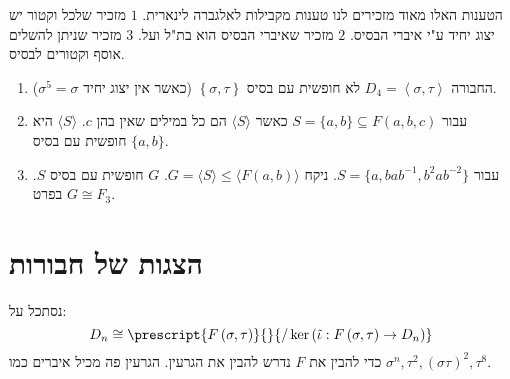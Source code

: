 \documentclass{tstextbook}
\begin{document}
\begin{remark}
הטענות האלו מאוד מזכירים לנו טענות מקבילות לאלגברה לינארית. \(1\) מזכיר שלכל וקטור יש יצוג יחיד ע"י איברי הבסיס. \(2\) מזכיר שאיברי הבסיס הוא בת"ל ועל. \(3\) מזכיר שניתן להשלים אוסף וקטורים לבסיס.

\end{remark}
\begin{example}
  \begin{enumerate}
    \item החבורה \(D_{4}=\left\langle  \sigma,\tau  \right\rangle\) לא חופשית עם בסיס \(\left\{  \sigma,\tau  \right\}\) (כאשר אין יצוג יחיד \(\sigma^5=\sigma\)). 


    \item עבור \(S=\{ a,b \}\subseteq F(a,b,c)\) כאשר \(\langle S\rangle\) הם כל במילים שאין בהן \(c\). \(\langle S\rangle\) היא חופשית עם בסיס \(\{ a,b \}\). 


    \item עבור \(S=\{ a,bab^{-1} ,b^2ab^{-2} \}\). ניקח \(G=\langle S\rangle \leq\langle F(a,b)\rangle\). \(G\) חופשית עם בסיס \(S\). בפרט \(G\cong F_{3}\). 


  \end{enumerate}
\end{example}
\section{הצגות של חבורות}

נסתכל על:
$$D_{n}\cong \prescript{F\left( \sigma,\tau \right)}{}{/\ker\left( \tilde{\iota}:F\left( \sigma,\tau \right)\to D_{n} \right) }$$
כדי להבין את \(F\) נדרש להבין את הגרעין. הגרעין פה מכיל איברים כמו \(\sigma^n,\tau^2,\left( \sigma \tau \right)^2,\tau^8\).
\end{document}
